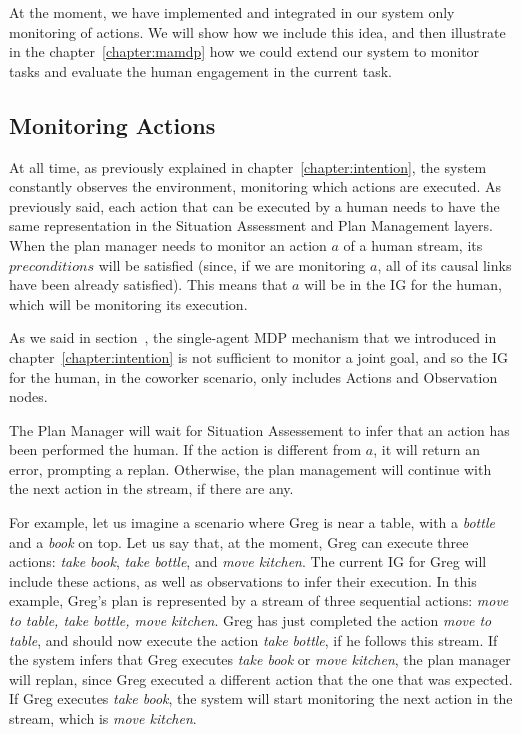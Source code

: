 At the moment, we have implemented and integrated in our system only monitoring of actions. We will show how we include this idea, and then illustrate in the chapter~\ref{chapter:mamdp} how we could extend our system to monitor tasks and evaluate the human engagement in the current task.

\subsection{Monitoring Actions}
At all time, as previously explained in chapter~\ref{chapter:intention}, the system constantly observes the environment, monitoring which actions are executed. As previously said, each action that can be executed by a human needs to have the same representation in the Situation Assessment and Plan Management layers. When the plan manager needs to monitor an action $a$ of a human stream, its $preconditions$ will be satisfied (since, if we are monitoring $a$, all of its causal links have been already satisfied). This means that $a$ will be in the IG for the human, which will be monitoring its execution.

As we said in section~\label{subsec:intention-unknown_intentions}, the single-agent MDP mechanism that we introduced in chapter~\ref{chapter:intention} is not sufficient to monitor a joint goal, and so the IG for the human, in the coworker scenario, only includes Actions and Observation nodes.

The Plan Manager will wait for Situation Assessement to infer that an action has been performed the human. If the action is different from $a$, it will return an error, prompting a replan. Otherwise, the plan management will continue with the next action in the stream, if there are any.

For example, let us imagine a scenario where Greg is near a table, with a \textit{bottle} and a \textit{book} on top. Let us say that, at the moment, Greg can execute three actions: \textit{take book}, \textit{take bottle}, and \textit{move kitchen}. The current IG for Greg will include these actions, as well as observations to infer their execution. In this example, Greg's plan is represented by a stream of three sequential actions: \textit{move to table, take bottle, move kitchen}. 
Greg has just completed the action \textit{move to table}, and should now execute the action \textit{take bottle}, if he follows this stream. If the system infers that Greg executes \textit{take book} or \textit{move kitchen}, the plan manager will replan, since Greg executed a different action that the one that was expected. If Greg executes \textit{take book}, the system will start monitoring the next action in the stream, which is \textit{move kitchen}.



